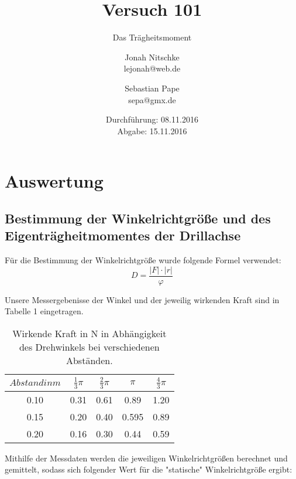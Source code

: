 

\title{Versuch 101}
\subtitle{Das Trägheitsmoment}
\author{Jonah Nitschke\\
        lejonah@web.de \and
        Sebastian Pape\\
        sepa@gmx.de}
\date{Durchführung: 08.11.2016\\
      Abgabe: 15.11.2016}





\maketitle



\section{Auswertung}
\subsection{Bestimmung der Winkelrichtgröße und des Eigenträgheitmomentes der Drillachse}
Für die Bestimmung der Winkelrichtgröße wurde folgende Formel verwendet:
\begin{equation}
  D = \frac{\lvert F \rvert \cdot \lvert r \rvert}{\varphi}
\end{equation}

Unsere Messergebenisse der Winkel und der jeweilig wirkenden Kraft sind in Tabelle 1 eingetragen.

\begin{table}
  \centering
  \caption{Wirkende Kraft in N in Abhängigkeit des Drehwinkels bei verschiedenen Abständen.}
  \label{tab:data1}
  \begin{tabular}{c c c c c}
    \toprule $Abstand in m$ & $\frac{1}{3} \pi$ & $\frac{2}{3} \pi$ & $ \pi$ & $\frac{4}{3} \pi$ \\
    \midrule
    0.10 & 0.31 & 0.61 & 0.89  & 1.20 \\
    0.15 & 0.20 & 0.40 & 0.595 & 0.89 \\
    0.20 & 0.16 & 0.30 & 0.44  & 0.59 \\
    \bottomrule
  \end{tabular}
\end{table}

Mithilfe der Messdaten werden die jeweiligen Winkelrichtgrößen berechnet und gemittelt,
sodass sich folgender Wert für die "statische" Winkelrichtgröße ergibt:

